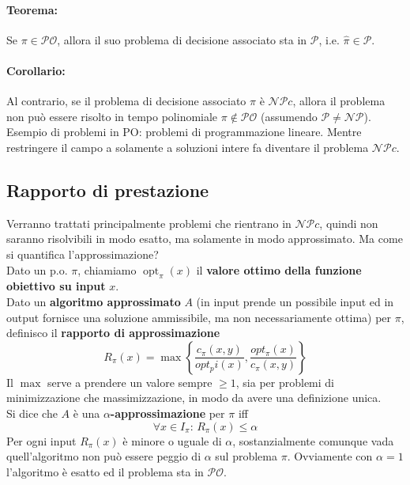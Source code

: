 \documentclass[11pt]{article}
\DeclareMathOperator*{\opt}{opt}
\begin{document}
	\paragraph{Teorema:} Se $\pi \in \mathcal{PO}$, allora il suo problema di decisione associato sta in $\mathcal{P}$, i.e. $\hat{\pi} \in \mathcal{P}$.\\
	
	\paragraph{Corollario:} Al contrario, se il problema di decisione associato $\hat{\pi}$ è $\mathcal{NP}c$, allora il problema non può essere risolto in tempo polinomiale $\pi \notin \mathcal{PO}$ (assumendo $\mathcal{P} \neq \mathcal{NP}$).\\
	
	Esempio di problemi in PO: problemi di programmazione lineare. Mentre restringere il campo a solamente a soluzioni intere fa diventare il problema $\mathcal{NP}c$.\\
	
	\newpage
	
	\subsection{Rapporto di prestazione} 
	
	Verranno trattati principalmente problemi che rientrano in $\mathcal{NP}c$, quindi non saranno risolvibili in modo esatto, ma solamente in modo approssimato. Ma come si quantifica l'approssimazione? \\
	
	Dato un p.o. $\pi$, chiamiamo $\opt_\pi (x)$ il \textbf{valore ottimo della funzione obiettivo su input} $x$.\\
	Dato un \textbf{algoritmo approssimato} $A$ (in input prende un possibile input ed in output fornisce una soluzione ammissibile, ma non necessariamente ottima) per $\pi$, definisco il \textbf{rapporto di approssimazione} 
	$$ R_\pi (x) = \max \left\{\frac{c_\pi (x,y)}{opt_pi(x)}, \frac{opt_\pi (x)}{c_\pi (x,y)} \right\} $$
	Il $\max$ serve a prendere un valore sempre $\geq 1$, sia per problemi di minimizzazione che massimizzazione, in modo da avere una definizione unica.\\
	
	Si dice che $A$ è una \textbf{$\alpha$-approssimazione} per $\pi$ iff 
	$$ \forall x \in I_\pi : \, R_\pi (x) \leq \alpha $$
	Per ogni input $R_\pi (x)$ è minore o uguale di $\alpha$, sostanzialmente comunque vada quell'algoritmo non può essere peggio di $\alpha$ sul problema $\pi$. Ovviamente con $\alpha = 1$ l'algoritmo è esatto ed il problema sta in $\mathcal{PO}$.\\
	
\end{document}
